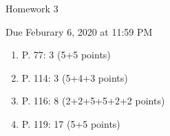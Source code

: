 \documentclass{article}
\begin{document}
\begin{center} \LARGE
Homework 3
\end{center}
\begin{center} \Large
Due Feburary 6, 2020 at 11:59 PM 
\end{center}



\begin{enumerate}
	\item P. 77: 3 (5+5 points) 
	\item P. 114: 3 (5+4+3 points) 
	\item P. 116: 8 (2+2+5+5+2+2 points)
	\item P. 119: 17 (5+5 points)
\end{enumerate}
% 
%
\end{document}
